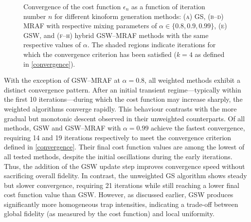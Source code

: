 \documentclass[../Thesis-IJspeert.tex]{subfiles}
\begin{document}
\begin{figure}[t]
	\caption[Convergence of the cost function $\epsilon_n$ as a function of iteration number $n$ for different kinoform generation methods]{Convergence of the cost function $\epsilon_n$ as a function of iteration number $n$ for different kinoform generation methods: \textsc{(a)} GS, \textsc{(b--d)} MRAF with respective mixing parameters of $\alpha \in \{0.8, 0.9, 0.99\}$, \textsc{(e)} GSW, and \textsc{(f--h)} hybrid GSW--MRAF methods with the same respective values of $\alpha$. The shaded regions indicate iterations for which the convergence criterion has been satisfied ($k=4$ as defined in \autoref{convergence}).}
	\label{convergenceplot} 
\end{figure}
With the exception of GSW--MRAF at $\alpha = 0.8$, all weighted methods exhibit a distinct convergence pattern. After an initial transient regime---typically within the first \num{10} iterations---during which the cost function may increase sharply, the weighted algorithms converge rapidly. This behaviour contrasts with the more gradual but monotonic descent observed in their unweighted counterparts. Of all methods, GSW and GSW--MRAF with $\alpha = 0.99$ achieve the fastest convergence, requiring \num{14} and \num{19} iterations respectively to meet the convergence criterion defined in \autoref{convergence}. Their final cost function values are among the lowest of all tested methods, despite the initial oscillations during the early iterations. Thus, the addition of the GSW update step improves convergence speed without sacrificing overall fidelity. In contrast, the unweighted GS algorithm shows steady but slower convergence, requiring \num{21} iterations while still reaching a lower final cost function value than GSW. However, as discussed earlier, GSW produces significantly more homogeneous trap intensities, indicating a trade-off between global fidelity (as measured by the cost function) and local uniformity.
\end{document}
